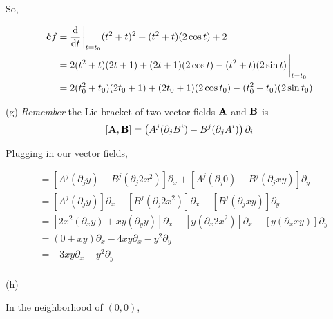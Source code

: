 \documentclass[10pt]{article}
\begin{document}
\begin{enumerate}[start=1,label={\bfseries Exercise \arabic*:},leftmargin=1in]
        So,

        \begin{align*}
            \dot{\vb{c}} f &= \dv{t} \eval_{t=t_0} (t^2+t)^2 + (t^2+t)(2\cos{t}) + 2  \\
                           &= 2(t^2+t)(2t+1) + (2t+1)(2\cos{t}) - (t^2+t)(2\sin{t}) \eval_{t=t_0} \\
                           &= 2(t_0^2+t_0)(2t_0+1) + (2t_0+1)(2\cos{t_0}) - (t_0^2+t_0)(2\sin{t_0})
        \end{align*}

        \noindent (g) \emph{Remember} the Lie bracket of two vector fields \(\vb{A}\) and \(\vb{B}\) is \[ [\vb{A}, \vb{B}] = \left( A^j(\partial_j B^i) - B^j(\partial_j A^i) \right) \partial_i\]

        \noindent Plugging in our vector fields,

        \begin{align*}
            [\vb{A}, \vb{B}] &= [ A^j ( \partial_j y ) - B^j ( \partial_j 2x^2 ) ]\partial_x + [ A^j ( \partial_j 0 ) - B^j ( \partial_j xy )  ]\partial_y \\
                             &= [ A^j ( \partial_j y ) ]\partial_x - [ B^j ( \partial_j 2x^2 ) ]\partial_x - [ B^j ( \partial_j xy )  ]\partial_y \\
                             &= [ 2x^2(\partial_x y ) + xy(\partial_y y ) ]\partial_x - [ y(\partial_x 2x^2)]\partial_x - [ y (\partial_x xy)  ]\partial_y \\
                             &= (0+xy)\partial_x - 4xy\partial_x - y^2\partial_y \\
                             &= -3xy\partial_x - y^2\partial_y \\
        \end{align*}

        \noindent (h)

        \noindent In the neighborhood of \((0,0)\),

        \begin{center}
        \end{center}


\end{enumerate}
\end{document}
